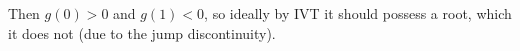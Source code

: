 \documentclass[10pt,letterpaper]{article} %
\newtheorem{lem}{Lemma}[section]
\begin{document}
Then $g(0) > 0$ and $g(1) < 0$, so ideally by IVT it should possess a root, which it does not (due to the jump discontinuity). 

\medskip

\pagebreak
\end{document}
